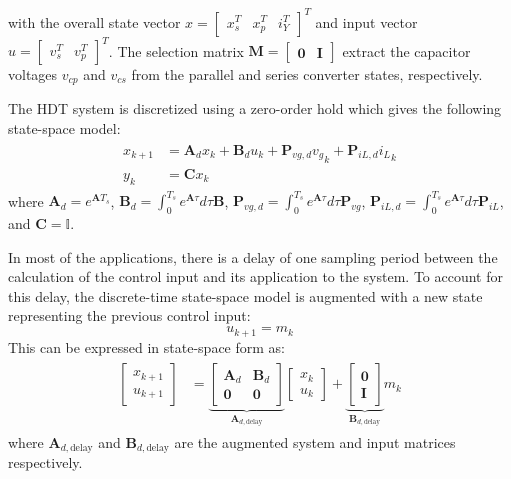 with the overall state vector $x = \begin{bmatrix} x_s^T & x_p^T & i_Y^T \end{bmatrix}^T$ and input vector $u = \begin{bmatrix} v_s^T & v_p^T \end{bmatrix}^T$. The selection matrix $\mathbf{M} = \begin{bmatrix} \mathbf{0} & \mathbf{I} \end{bmatrix}$ extract the capacitor voltages $v_{cp}$ and $v_{cs}$ from the parallel and series converter states, respectively.

The HDT system is discretized using a zero-order hold which gives the following state-space model:
\begin{align}
    \begin{aligned}
        x_{k + 1} &= \mathbf{A}_d x_k + \mathbf{B}_d u_k + \mathbf{P}_{vg,d} {v_g}_k + \mathbf{P}_{iL,d} {i_L}_k\\
        y_k &= \mathbf{C} x_k
    \end{aligned}
\end{align}
where $\mathbf{A}_d = e^{\mathbf{A}T_s}$, $\mathbf{B}_d = \int_0^{T_s} e^{\mathbf{A}\tau} d\tau \mathbf{B}$, $\mathbf{P}_{vg,d} = \int_0^{T_s} e^{\mathbf{A}\tau} d\tau \mathbf{P}_{vg}$, $\mathbf{P}_{iL,d} = \int_0^{T_s} e^{\mathbf{A}\tau} d\tau \mathbf{P}_{iL}$, and $\mathbf{C} = \mathbb{I}$.

In most of the applications, there is a delay of one sampling period between the calculation of the control input and its application to the system. To account for this delay, the discrete-time state-space model is augmented with a new state representing the previous control input:
\begin{equation}
    u_{k + 1} = m_k 
\end{equation}
This can be expressed in state-space form as:
\begin{align}
    \begin{aligned}
        \begin{bmatrix}
            x_{k + 1}\\
            u_{k + 1}
        \end{bmatrix}
        &=
        \underbrace{
        \begin{bmatrix}
            \mathbf{A}_d & \mathbf{B}_d \\
            \mathbf{0} & \mathbf{0}
        \end{bmatrix}
        }_{\mathbf{A}_{d,\text{delay}}}
        \begin{bmatrix}
            x_k\\
            u_k
        \end{bmatrix}
        +
        \underbrace{
        \begin{bmatrix}
            \mathbf{0}\\
            \mathbf{I}
        \end{bmatrix}
        }_{\mathbf{B}_{d,\text{delay}}}
        m_k \label{eq:AugmentedModel}
    \end{aligned}
\end{align}
where $\mathbf{A}_{d,\text{delay}}$ and $\mathbf{B}_{d,\text{delay}}$ are the augmented system and input matrices respectively.